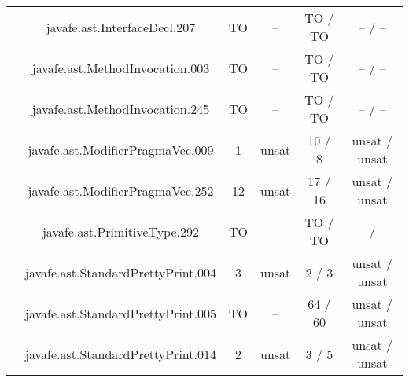 \begin{table}[htbp]
\begin{minipage}{0.60\textwidth}
{\begin{tabular}[c]{c c!{\vrule width 1.5pt}c|c!{\vrule width 1.5pt}c|c|}
		 	& javafe.ast.InterfaceDecl.207	    			     & TO   & --      & TO  / TO       & --    / --        \\
		 	& javafe.ast.MethodInvocation.003    			     & TO   & --      & TO  / TO       & --    / --        \\
		 	& javafe.ast.MethodInvocation.245    			     & TO   & --      & TO  / TO       & --    / --        \\
		 	& javafe.ast.ModifierPragmaVec.009  			     & 1    & unsat   & 10  / 8        & unsat / unsat     \\
 			& javafe.ast.ModifierPragmaVec.252    			     & 12   & unsat   & 17  / 16       & unsat / unsat     \\
 			&  javafe.ast.PrimitiveType.292   			     & TO   & --      & TO  / TO       & --    / --        \\
 			&  javafe.ast.StandardPrettyPrint.004   		     & 3    & unsat   & 2   / 3        & unsat / unsat     \\
 			& javafe.ast.StandardPrettyPrint.005    		     & TO   & --      & 64  / 60       & unsat / unsat     \\
 			& javafe.ast.StandardPrettyPrint.014    		     & 2    & unsat   & 3   / 5        & unsat / unsat     \\

\end{tabular}}
\end{minipage}
\end{table}
